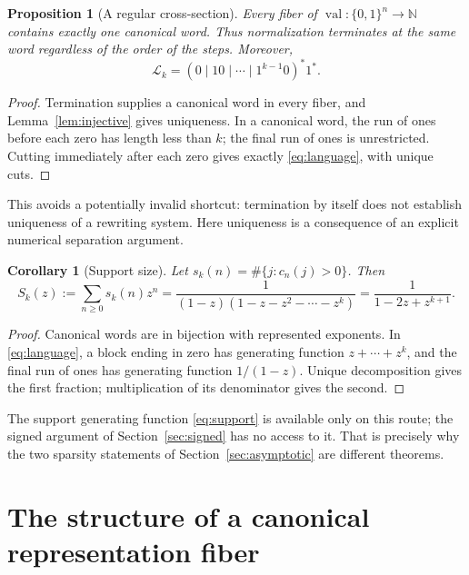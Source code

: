 \documentclass[11pt,letterpaper]{article}
\numberwithin{equation}{section}
\newtheorem{proposition}[theorem]{Proposition}
\newtheorem{corollary}[theorem]{Corollary}
\theoremstyle{definition}
\theoremstyle{remark}
\newcommand{\N}{\mathbb N}
\newcommand{\val}{\operatorname{val}}
\newcommand{\cL}{\mathcal L}
\begin{document}
\begin{proposition}[A regular cross-section]
\label{prop:normal}
Every fiber of $\val:\{0,1\}^n\to\N$ contains exactly one canonical word.
Thus normalization terminates at the same word regardless of the order
of the steps. Moreover,
\begin{equation}
 \cL_k=(0\mid10\mid\cdots\mid1^{k-1}0)^*1^*.
 \label{eq:language}
\end{equation}
\end{proposition}
\begin{proof}
Termination supplies a canonical word in every fiber, and
Lemma~\ref{lem:injective} gives uniqueness. In a canonical word, the run
of ones before each zero has length less than $k$; the final run of ones
is unrestricted. Cutting immediately after each zero gives exactly
\eqref{eq:language}, with unique cuts.
\end{proof}

This avoids a potentially invalid shortcut: termination by itself does
not establish uniqueness of a rewriting system. Here uniqueness is a
consequence of an explicit numerical separation argument.

\begin{corollary}[Support size]
\label{cor:support}
Let $s_k(n)=\#\{j:c_n(j)>0\}$. Then
\begin{equation}
 S_k(z):=\sum_{n\ge0}s_k(n)z^n
 =\frac{1}{(1-z)(1-z-z^2-\cdots-z^k)}
 =\frac1{1-2z+z^{k+1}}.
 \label{eq:support}
\end{equation}
\end{corollary}
\begin{proof}
Canonical words are in bijection with represented exponents. In
\eqref{eq:language}, a block ending in zero has generating function
$z+\cdots+z^k$, and the final run of ones has generating function
$1/(1-z)$. Unique decomposition gives the first fraction; multiplication
of its denominator gives the second.
\end{proof}

The support generating function \eqref{eq:support} is available only on this
route; the signed argument of Section~\ref{sec:signed} has no access to it.
That is precisely why the two sparsity statements of
Section~\ref{sec:asymptotic} are different theorems.

\section{The structure of a canonical representation fiber}
\label{sec:fibers}
\end{document}
